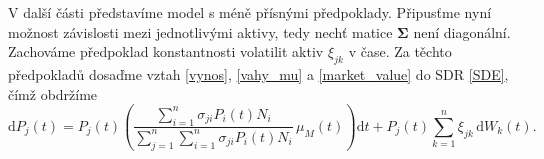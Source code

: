 \documentclass[a4paper,12pt]{report}
\theoremstyle{definition} \newtheorem{definice}[veta]{Definice}
\theoremstyle{remark}
\begin{document}

V další části představíme model s méně přísnými předpoklady.
Připusťme nyní možnost závislosti mezi jednotlivými aktivy, tedy nechť matice $\boldsymbol{\Sigma}$ není diagonální.
Zachováme předpoklad konstantnosti volatilit aktiv $\xi_{jk}$ v čase.
Za těchto předpokladů dosaďme vztah \eqref{vynos}, \eqref{vahy_mu} a \eqref{market_value} do SDR \eqref{SDE}, čímž obdržíme
\begin{equation} \label{SDE_cen}
 \mathrm{d}P_j(t)=P_j(t)\left(\frac{\sum\limits_{i=1}^n\sigma_{ji}P_i(t)N_i}{\sum\limits_{j=1}^n\sum\limits_{i=1}^n\sigma_{ji}P_i(t)N_i}\, \mu_M(t)\right)\mathrm{d}t+P_j(t)\sum_{k=1}^{n}\xi_{jk}\,\mathrm{d}W_k(t).
\end{equation}
\end{document}

